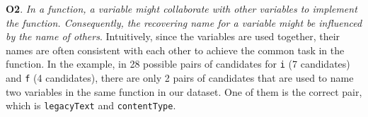 





\textbf{O2}. \textit{In a function, a variable might collaborate with
  other variables to implement the function. Consequently, the
  recovering name for a variable might be influenced by the name of
  others}. Intuitively, since the variables are used together, their
names are often consistent with each other to achieve the
common task in the function.
%
In the example, in 28 possible pairs of candidates for \texttt{i} (7
candidates) and \texttt{f} (4 candidates), there are only 2 pairs of
candidates that are used to name two variables in the same function
in our dataset. One of them is the correct pair, which is
\texttt{legacyText} and \texttt{contentType}.
%

